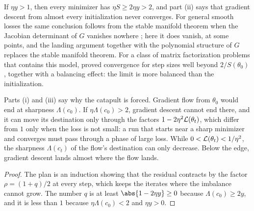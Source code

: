 \begin{refsection}
If $\eta y>1$, then every minimizer has $\eta S\ge2\eta y>2$, and part (ii) says that gradient descent from almost every initialization never converges. For general smooth losses the same conclusion follows from the stable manifold theorem when the Jacobian determinant of $G$ vanishes nowhere \parencite{LeeEtAl2016,LeeEtAl2019}; here it does vanish, at some points, and the landing argument together with the polynomial structure of $G$ replaces the stable manifold theorem. For a class of matrix factorization problems that contains this model, \textcite{WangEtAl2022} proved convergence for step sizes well beyond $2/S(\theta_0)$, together with a balancing effect: the limit is more balanced than the initialization.

Parts (i) and (iii) say why the catapult is forced. Gradient flow from $\theta_0$ would end at sharpness $\Lambda(c_0)$. If $\eta\Lambda(c_0)>2$, gradient descent cannot end there, and it can move its destination only through the factors $1-2\eta^2\mathcal{L}(\theta_t)$, which differ from $1$ only when the loss is not small: a run that starts near a sharp minimizer and converges must pass through a phase of large loss. While $0<\mathcal{L}(\theta_t)<1/\eta^2$, the sharpness $\Lambda(c_t)$ of the flow's destination can only decrease. Below the edge, gradient descent lands almost where the flow lands.

\begin{proposition}[Below the edge, gradient descent follows the flow]\label[proposition]{prop:stability:lazy}
Let $\eta y<1$ and let $\theta_0$ satisfy $\eta\Lambda(c_0)<2$. Put $q=\max\{\eta\Lambda(c_0)-1,\,1-2\eta y\}$, which lies in $[0,1)$, and suppose that $\abs{z_0}\le(1-q)/(8\eta)$. Then $\abs{z_t}\le\bigl(\frac{1+q}2\bigr)^t\abs{z_0}$ for every $t$, $\abs{c_t}$ is nonincreasing, the iterates converge to a minimizer, and
\[
  \abs{c_0}\ \ge\ \abs{c_\infty}\ \ge\ \abs{c_0}\Bigl(1-\frac{2\eta^2z_0^2}{1-q}\Bigr).
\]
\end{proposition}

\begin{proof}
The plan is an induction showing that the residual contracts by the factor $\rho=(1+q)/2$ at every step, which keeps the iterates where the imbalance cannot grow. The number $q$ is at least $\abs{1-2\eta y}\ge0$ because $\Lambda(c_0)\ge2y$, and it is less than $1$ because $\eta\Lambda(c_0)<2$ and $\eta y>0$.


\end{proof}
\end{refsection}
